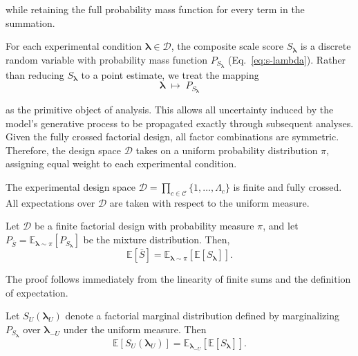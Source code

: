 while retaining the full probability mass function for every term in the summation.

For each experimental condition  
\(\boldsymbol{\lambda} \in \mathcal{D}\), the composite scale score
$S_{\boldsymbol{\lambda}}$ 
is a discrete random variable with probability mass function
\(P_{S_{\boldsymbol{\lambda}}}\) (Eq.~\ref{eq:s-lambda}).
Rather than reducing \(S_{\boldsymbol{\lambda}}\) to a point estimate,
we treat the mapping
\begin{equation}
\boldsymbol{\lambda}
\;\mapsto\;
P_{S_{\boldsymbol{\lambda}}}    
\end{equation}

as the primitive object of analysis.  
This allows all uncertainty induced by the model's generative process to be propagated exactly through subsequent analyses.
Given the fully crossed factorial design, 
all factor combinations are symmetric.
Therefore, 
the design space $\mathcal{D}$ takes on a uniform probability
distribution $\pi$, 
assigning equal weight
to each experimental condition.

\begin{assumption}
\label{ass:fully-crossed}
The experimental design space
\(
\mathcal{D} = \prod_{c \in \mathcal{C}} \{1,\dots,\Lambda_c\}
\)
is finite and fully crossed. All expectations over
\(\mathcal{D}\) are taken with respect to the uniform measure.
\end{assumption}


\begin{proposition}
\label{prop:linearity-mixture}
Let $\mathcal{D}$ be a finite factorial design with probability measure $\pi$, and let $P_{\bar S} = \mathbb{E}_{\boldsymbol{\lambda} \sim \pi} [P_{S_{\boldsymbol{\lambda}}}]$ be the mixture distribution. Then,
\begin{equation}
\label{eq:mixture-expectation}
\mathbb{E}[\bar S]
=
\mathbb{E}_{\boldsymbol{\lambda} \sim \pi}
\!\left[
\mathbb{E}[S_{\boldsymbol{\lambda}}]
\right].
\end{equation}
\end{proposition}

The proof follows immediately from the linearity of finite sums and the definition of expectation.


\begin{corollary}
\label{cor:anova-consistency}
Let $S_U(\boldsymbol{\lambda}_U)$ denote a factorial
marginal distribution defined by marginalizing $P_{S_{\boldsymbol{\lambda}}}$ over
$\boldsymbol{\lambda}_{-U}$ under the uniform measure.
Then
\[
\mathbb{E}\!\left[S_U(\boldsymbol{\lambda}_U)\right]
=
\mathbb{E}_{\boldsymbol{\lambda}_{-U}}
\!\left[
\mathbb{E}[S_{\boldsymbol{\lambda}}]
\right].
\]
\end{corollary}


